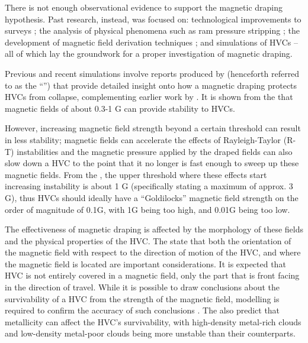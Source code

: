 There is not enough observational evidence to support the magnetic draping hypothesis. Past research, instead, was focused on: technological improvements to surveys \citep{ID52, ID71, ID1, ID3, ID6, ID18, ID43, ID44, ID45}; the analysis of physical phenomena such as ram pressure stripping \citep{ID11, ID23, ID33}; the development of magnetic field derivation techniques \citep{ID5, ID23, ID30, ID11, ID26, ID21}; and simulations of HVCs \citep{ID13, ID23, ID24, ID33, ID34} – all of which lay the groundwork for a proper investigation of magnetic draping.


Previous and recent simulations involve reports produced by \cite{ID23, ID24, ID33} (henceforth referred to as the “\citeauthor[][simulations]{ID23}”) that provide detailed insight onto how a magnetic draping protects HVCs from collapse, complementing earlier work by \cite{ID13, ID11}. It is shown from the \citeauthor[][simulations]{ID23} that magnetic fields of about 0.3-1 {\textmu}G can provide stability to HVCs.


However, increasing magnetic field strength beyond a certain threshold can result in less stability; magnetic fields can accelerate the effects of Rayleigh-Taylor (R-T) instabilities and the magnetic pressure applied by the draped fields can also slow down a HVC to the point that it no longer is fast enough to sweep up these magnetic fields. From the \citeauthor[][simulations]{ID23}, the upper threshold where these effects start increasing instability is about 1 {\textmu}G (specifically stating a maximum of approx. 3 {\textmu}G), thus HVCs should ideally have a “Goldilocks” magnetic field strength on the order of magnitude of 0.1{\textmu}G, with 1{\textmu}G being too high, and 0.01{\textmu}G being too low.


The effectiveness of magnetic draping is affected by the morphology of these fields and the physical properties of the HVC. The \citeauthor[][simulations]{ID23} state that both the orientation of the magnetic field with respect to the direction of motion of the HVC, and where the magnetic field is located are important considerations. It is expected that HVC is not entirely covered in a magnetic field, only the part that is front facing in the direction of travel. While it is possible to draw conclusions about the survivability of a HVC from the strength of the magnetic field, modelling is required to confirm the accuracy of such conclusions \citep{ID5}. The \citeauthor[][simulations]{ID23} also predict that metallicity can affect the HVC's survivability, with high-density metal-rich clouds and low-density metal-poor clouds being more unstable than their counterparts.


